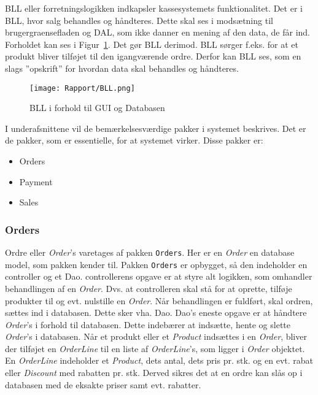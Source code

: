 \gls{BLL} eller \gls{forretningslogik}ken indkapsler kassesystemets funktionalitet. Det er i \gls{BLL}, hvor salg behandles og håndteres. Dette skal ses i modsætning til \Gls{brugergraenseflade}n og \gls{DAL}, som ikke danner en mening af den data, de får ind. Forholdet kan ses i Figur~\ref{fig:bll}. Det gør \gls{BLL} derimod. \gls{BLL} sørger f.eks. for at et produkt bliver tilføjet til den igangværende ordre. Derfor kan \gls{BLL} ses, som en slags ''opskrift'' for hvordan data skal behandles og håndteres.

\begin{figure}[H]
	\centering
	\texttt{[image: Rapport/BLL.png]}
	\caption{BLL i forhold til GUI og Databasen}
	\label{fig:bll}
\end{figure}

I underafsnittene vil de bemærkelsesværdige pakker i systemet beskrives. Det er de pakker, som er essentielle, for at systemet virker. Disse pakker er:
\begin{itemize}
	\item Orders
	\item Payment
	\item Sales
\end{itemize}

\subsubsection{Orders}
Ordre eller \textit{Order}'s varetages af pakken \texttt{Orders}. Her er en \textit{Order} en database model, som pakken kender til. Pakken \texttt{Orders} er opbygget, så den indeholder en \Gls{controller} og et \gls{Dao}. \Gls{controller}ens opgave er at styre alt logikken, som omhandler behandlingen af en \textit{Order}. Dvs. at \gls{controller}en skal stå for at oprette, tilføje produkter til og evt. nulstille en \textit{Order}. Når behandlingen er fuldført, skal ordren, sættes ind i databasen. Dette sker vha. \gls{Dao}. \gls{Dao}'s eneste opgave er at håndtere \textit{Order}'s i forhold til databasen. Dette indebærer at indsætte, hente og slette \textit{Order}'s i databasen.
\newline\newline
Når et produkt eller et \textit{Product} indsættes i en \textit{Order}, bliver der tilføjet en \textit{OrderLine} til en liste af \textit{OrderLine}'s, som ligger i \textit{Order} objektet. En \textit{OrderLine} indeholder et \textit{Product}, dets antal, dets pris pr. stk. og en evt. rabat eller \textit{Discount} med rabatten pr. stk. Derved sikres det at en ordre kan slås op i databasen med de eksakte priser samt evt. rabatter.

